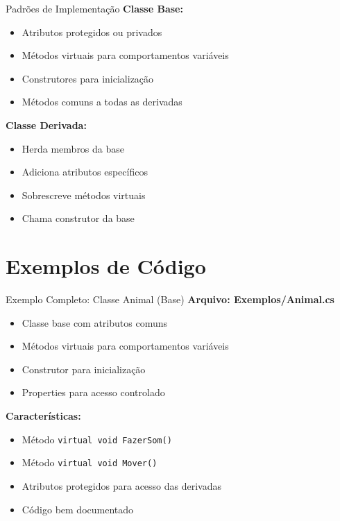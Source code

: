 \documentclass[aspectratio=169]{beamer}
\begin{document}
\begin{frame}{Padrões de Implementação}
\textbf{Classe Base:}
\begin{itemize}
\item Atributos protegidos ou privados
\item Métodos virtuais para comportamentos variáveis
\item Construtores para inicialização
\item Métodos comuns a todas as derivadas
\end{itemize}

\textbf{Classe Derivada:}
\begin{itemize}
\item Herda membros da base
\item Adiciona atributos específicos
\item Sobrescreve métodos virtuais
\item Chama construtor da base
\end{itemize}
\end{frame}

\section{Exemplos de Código}

\begin{frame}{Exemplo Completo: Classe Animal (Base)}
\textbf{Arquivo: Exemplos/Animal.cs}
\begin{itemize}
\item Classe base com atributos comuns
\item Métodos virtuais para comportamentos variáveis
\item Construtor para inicialização
\item Properties para acesso controlado
\end{itemize}

\vspace{0.3cm}
\textbf{Características:}
\begin{itemize}
\item Método \texttt{virtual void FazerSom()}
\item Método \texttt{virtual void Mover()}
\item Atributos protegidos para acesso das derivadas
\item Código bem documentado
\end{itemize}
\end{frame}
\end{document}
